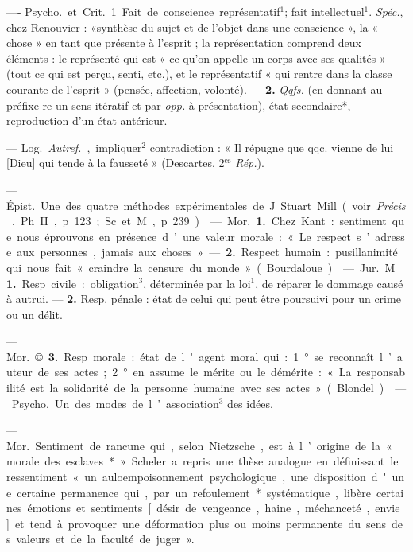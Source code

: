 \begin{itemize}[leftmargin=1cm, label=, itemsep=1pt]
 —- \si{Psycho.} et \si{Crit.}
1. Fait de conscience représentatif$^1$;
fait intellectuel$^1$. {\it Spéc.}, chez Renouvier : «synthèse du sujet et de l’objet
dans une conscience », la « chose »
en tant que présente à l'esprit ; la
représentation comprend deux éléments : le représenté qui est « ce
qu’on appelle un corps avec ses qualités » (tout ce qui est perçu, senti,
etc.), et le représentatif « qui rentre
dans la classe courante de l'esprit »
(pensée, affection, volonté). — {\bf 2.}
{\it Qqfs.} (en donnant au préfixe re un
sens itératif et par {\it opp.} à présentation), état secondaire*, reproduction d’un état antérieur.

 — \si{Log.} {\it Autref.}, impliquer$^2$
contradiction : « Il répugne que
qqc. vienne de lui [Dieu] qui tende
à la fausseté » (Descartes, 2$^\text{es}$ {\it Rép.}).

 — \si{Épist.} Une
des quatre méthodes expérimentales de J. Stuart Mill (voir {\it Précis},
Ph. II, p. 123; Sc. et M., p. 239).

 — \si{Mor.} {\bf 1.} Chez Kant : sentiment que nous éprouvons en présence d’une valeur morale : « Le
respect s’adresse aux personnes, jamais aux choses » — {\bf 2.} Respect
humain : pusillanimité qui nous fait
« craindre la censure du monde »
(Bourdaloue).

 — \si{Jur.} M {\bf 1.} Resp. civile:
obligation$^3$, déterminée par la loi$^1$,
de réparer le dommage causé à
autrui. — {\bf 2.} Resp. pénale : état de
celui qui peut être poursuivi pour
un crime ou un délit.

— \si{Mor.} ©. {\bf 3.} Resp. morale : état de
l'agent moral qui : 1° se reconnaît
l’auteur de ses actes; 2° en assume
le mérite ou le démérite : « La responsabilité est la solidarité de la
personne humaine avec ses actes »
(Blondel).

 —
\si{Psycho.} Un des modes de l’association$^3$ des idées.

 — \si{Mor.} Sentiment de
rancune qui, selon Nietzsche, est à
l’origine de la « morale des esclaves* »
Scheler a repris une thèse analogue
en définissant le ressentiment « un
auloempoisonnement psychologique,...
une disposition d'une certaine permanence qui, par un refoulement*
systématique, libère certaines émotions et sentiments [désir de vengeance, haine, méchanceté, envie]
et tend à provoquer une déformation plus ou moins permanente du
sens des valeurs et de la faculté de
juger ».


\end{itemize}
